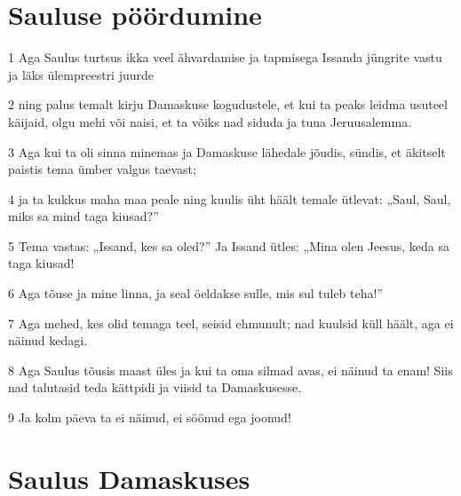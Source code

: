 \section*{Sauluse pöördumine}

\par 1 Aga Saulus turtsus ikka veel ähvardamise ja tapmisega Issanda jüngrite vastu ja läks ülempreestri juurde
\par 2 ning palus temalt kirju Damaskuse kogudustele, et kui ta peaks leidma usuteel käijaid, olgu mehi või naisi, et ta võiks nad siduda ja tuua Jeruusalemma.
\par 3 Aga kui ta oli sinna minemas ja Damaskuse lähedale jõudis, sündis, et äkitselt paistis tema ümber valgus taevast;
\par 4 ja ta kukkus maha maa peale ning kuulis üht häält temale ütlevat: „Saul, Saul, miks sa mind taga kiusad?”
\par 5 Tema vastas: „Issand, kes sa oled?” Ja Issand ütles: „Mina olen Jeesus, keda sa taga kiusad!
\par 6 Aga tõuse ja mine linna, ja seal öeldakse sulle, mis sul tuleb teha!”
\par 7 Aga mehed, kes olid temaga teel, seisid ehmunult; nad kuulsid küll häält, aga ei näinud kedagi.
\par 8 Aga Saulus tõusis maast üles ja kui ta oma silmad avas, ei näinud ta enam! Siis nad talutasid teda kättpidi ja viisid ta Damaskusesse.
\par 9 Ja kolm päeva ta ei näinud, ei söönud ega joonud!

\section*{Saulus Damaskuses}

